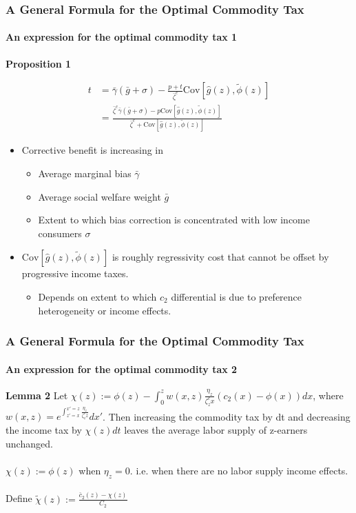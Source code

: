 \documentclass{beamer}
\newcommand{\Cov}{\mathrm{Cov}}
\begin{document}
\begin{frame}
\frametitle{A General Formula for the Optimal Commodity Tax}
\framesubtitle{An expression for the optimal commodity tax 1}

\textbf{Proposition 1} 

\begin{align}
t &= \bar{\gamma}(\bar{g} + \sigma) - \frac{p+t}{\bar{\zeta}^c} \Cov \left[\hat{g}(z), \tilde{\phi}(z) \right] \\
&= \frac{\bar{\zeta}^c \bar{\gamma} (\bar{g}  + \sigma) - p\Cov \left[ \hat{g}(z),\tilde{\phi}(z) \right]}{\bar{\zeta}^c + \Cov \left[\hat{g}(z), \tilde{\phi}(z) \right]}
\end{align}


\begin{itemize}

\item Corrective benefit is increasing in 
	\begin{itemize}
	 \item Average marginal bias $\bar{\gamma}$
	 \item  Average social welfare weight $\bar{g}$
	 \item Extent to which bias correction is concentrated with low income consumers $\sigma$
	\end{itemize}
\item $\Cov \left[ \hat{g}(z), \tilde{\phi}(z) \right]$ is roughly regressivity cost that cannot be offset by progressive income taxes. 
\begin{itemize}
	\item Depends on extent to which $c_2$ differential is due to preference heterogeneity or income effects. 
\end{itemize}
\end{itemize}

\end{frame}




\begin{frame}
\frametitle{A General Formula for the Optimal Commodity Tax}
\framesubtitle{An expression for the optimal commodity tax 2}

\textbf{Lemma 2} Let $\chi(z) := \phi(z) - \int_{0}^{z} w(x,z) \frac{\eta_z}{\zeta_z^c x}(c_2(x) - \phi(x))dx$, where $w(x,z) = e^{\int_{z'=x}^{x'=z}\frac{\eta_z}{\zeta_z^c z}}dx'$. Then increasing the commodity tax by dt and decreasing the income tax by $\chi(z)dt$ leaves the average labor supply of z-earners unchanged. \\~\\ 

$\chi(z) := \phi(z)$ when $\eta_z = 0$. i.e. when there are no labor supply income effects. \\~\\ 

Define $\tilde{\chi}(z) := \frac{\bar{c}_2(z) - \chi(z)}{C_2}$
 
\end{frame}
\end{document}
